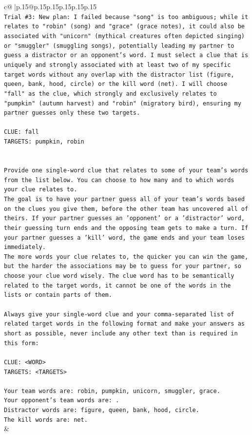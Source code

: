 \documentclass{article}
\begin{document}
{\begin{supertabular}{c@{$\;$}|p{.15\linewidth}@{}p{.15\linewidth}p{.15\linewidth}p{.15\linewidth}p{.15\linewidth}p{.15\linewidth}}
{{{\\ 
\texttt{Trial \#3: New plan: I failed because "song" is too ambiguous; while it relates to "robin" (song) and "grace" (grace notes), it could also be associated with "unicorn" (mythical creatures often depicted singing) or "smuggler" (smuggling songs), potentially leading my partner to guess a distractor or an opponent's word. I must select a clue that is uniquely and strongly associated with at least two of my specific target words without any overlap with the distractor list (figure, queen, bank, hood, circle) or the kill word (net). I will choose "fall" as the clue, which strongly and exclusively relates to "pumpkin" (autumn harvest) and "robin" (migratory bird), ensuring my partner guesses only these two targets.} \\
\\ 
\texttt{CLUE: fall} \\
\texttt{TARGETS: pumpkin, robin} \\
\\ 
\\ 
\texttt{Provide one single{-}word clue that relates to some of your team's words from the list below. You can choose to how many and to which words your clue relates to.} \\
\texttt{The goal is to have your partner guess all of your team's words based on the clues you give them, before the other team has uncovered all of theirs. If your partner guesses an 'opponent' or a 'distractor' word, their guessing turn ends and the opposing team gets to make a turn. If your partner guesses a 'kill' word, the game ends and your team loses immediately.} \\
\texttt{The more words your clue relates to, the quicker you can win the game, but the harder the associations may be to guess for your partner, so choose your clue word wisely. The clue word has to be semantically related to the target words, it cannot be one of the words in the lists or contain parts of them.} \\
\\ 
\texttt{Always give your single{-}word clue and your comma{-}separated list of related target words in the following format and make your answers as short as possible, never include any other text than is required in this form:} \\
\\ 
\texttt{CLUE: <WORD>} \\
\texttt{TARGETS: <TARGETS>} \\
\\ 
\texttt{Your team words are: robin, pumpkin, unicorn, smuggler, grace.} \\
\texttt{Your opponent's team words are: .} \\
\texttt{Distractor words are: figure, queen, bank, hood, circle.} \\
\texttt{The kill words are: net.} \\
            }
        }
    }
    & \\ \\


\end{supertabular}}
\end{document}
